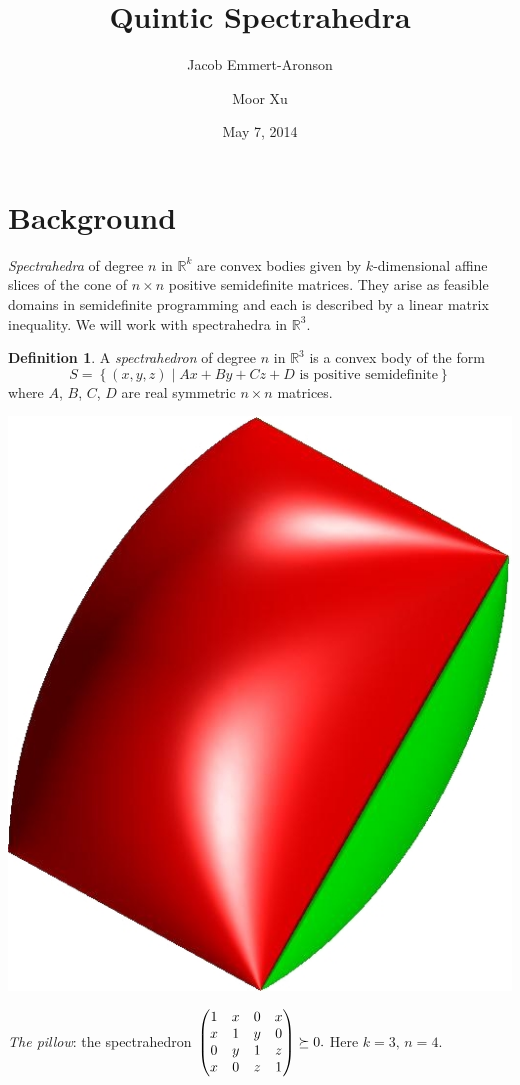 \documentclass[12pt]{amsart}
\title{Quintic Spectrahedra}
\author{Jacob Emmert-Aronson}
\author{Moor Xu}
\date{May 7, 2014}
\theoremstyle{plain}
\theoremstyle{definition}
\newtheorem{definition}[theorem]{Definition}
\begin{document}
 
\maketitle

\section{Background}

\emph{Spectrahedra} of degree $n$ in $\mathbb{R}^k$ are convex bodies
given by $k$-dimensional affine slices of the cone of $n \times n$
positive semidefinite matrices.  They arise as feasible domains in
semidefinite programming and each is described by a linear matrix
inequality. We will work with spectrahedra in $\mathbb R^3$.

\begin{definition} 
	A \emph{spectrahedron} of degree $n$ in $\mathbb R^3$ is a convex body
	of the form 
	\[ 
		S = \left\{
		(x,y,z) \mid Ax + By + Cz + D \text{ is positive semidefinite} \right\}
	\] 
	where $A$, $B$, $C$, $D$ are real symmetric $n\times n$ matrices.
\end{definition} 

\bigskip

\begin{center}
\includegraphics[scale=.15]{pillow.jpg}
\bigskip

{\small
\emph{The pillow}: the spectrahedron
$
\begin{pmatrix}
  1&x&0&x\\
  x&1&y&0\\
  0&y&1&z\\
  x&0&z&1
\end{pmatrix}
\succeq 0\text.$  Here $k=3,\, n=4$.}
\end{center}
\bigskip
\end{document}
